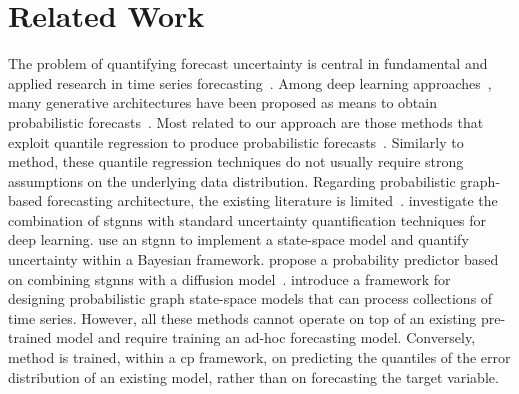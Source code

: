 \section{Related Work}
\label{sec:related}

The problem of quantifying forecast uncertainty is central in fundamental and applied research in time series forecasting~\cite{hyndman2018forecasting, petropoulos2022forecasting}. Among deep learning approaches~\cite{benidis2022deep}, many generative architectures have been proposed as means to obtain probabilistic forecasts~\cite{salinas2020deepar,rangapuram2018deep, debezenac2020normalizing, rasul2021autoregressive}. Most related to our approach are those methods that exploit quantile regression to produce probabilistic forecasts~\cite{wen2017multi, gasthaus2019probabilistic, kan2022multivariate, gouttes2021probabilistic}. 
Similarly to \gls{method}, these quantile regression techniques do not usually require strong assumptions on the underlying data distribution.  
Regarding probabilistic graph-based forecasting architecture, the existing literature is limited~\cite{jin2023survey, cini2023graphdeep}. \citet{wu2021quantifying} investigate the combination of \glspl{stgnn} with standard uncertainty quantification techniques for deep learning. \citet{pal2021rnn} use an \gls{stgnn} to implement a state-space model and quantify uncertainty within a Bayesian framework. \citet{wen2023diffstg} propose a probability predictor based on combining \glspl{stgnn} with a diffusion model~\cite{ho2020denoising}. \citet{zambon2023graph} introduce a framework for designing probabilistic graph state-space models that can process collections of time series. However, all these methods cannot operate on top of an existing pre-trained model and require training an ad-hoc forecasting model. Conversely, \gls{method} is trained, within a \gls{cp} framework, on predicting the quantiles of the error distribution of an existing model, rather than on forecasting the target variable.

